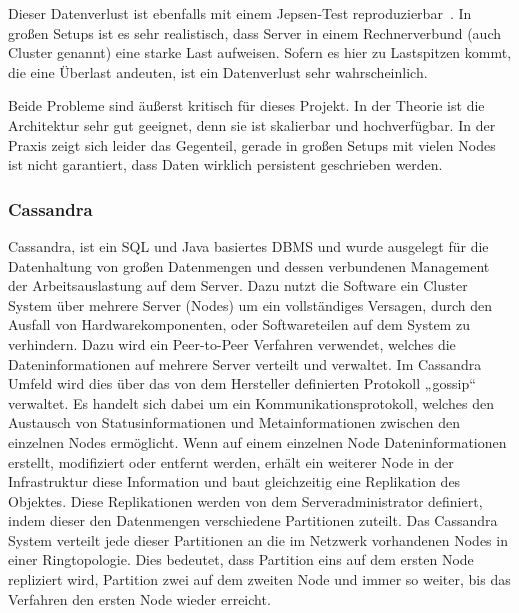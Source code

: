 Dieser Datenverlust ist ebenfalls mit einem Jepsen-Test
reproduzierbar~\cite{es_jepsen_pause}. In großen Setups ist es sehr
realistisch, dass Server in einem Rechnerverbund (auch Cluster genannt) eine
starke Last aufweisen. Sofern es hier zu Lastspitzen kommt, die eine Überlast
andeuten, ist ein Datenverlust sehr wahrscheinlich.

Beide Probleme sind äußerst kritisch für dieses Projekt. In der Theorie ist die
Architektur sehr gut geeignet, denn sie ist skalierbar und hochverfügbar. In
der Praxis zeigt sich leider das Gegenteil, gerade in großen Setups mit vielen
Nodes ist nicht garantiert, dass Daten wirklich persistent geschrieben werden.
\tm%

\subsubsection{Cassandra}
\label{subsubsec:cassandra}
Cassandra, ist ein \gls{SQL} und Java basiertes \gls{DBMS} und wurde ausgelegt
für die Datenhaltung von großen Datenmengen und dessen verbundenen
Management der Arbeitsauslastung auf dem Server. Dazu nutzt die Software ein
Cluster System über mehrere Server (Nodes) um ein vollständiges Versagen, durch
den Ausfall von Hardwarekomponenten, oder Softwareteilen auf dem System zu
verhindern. Dazu wird ein \gls{Peer-to-Peer} Verfahren verwendet, welches die
Dateninformationen auf mehrere Server verteilt und verwaltet. Im Cassandra
Umfeld wird dies über das von dem Hersteller definierten Protokoll „gossip“
verwaltet. Es handelt sich dabei um ein Kommunikationsprotokoll, welches den
Austausch von Statusinformationen und Metainformationen zwischen den einzelnen
Nodes ermöglicht. Wenn auf einem einzelnen Node Dateninformationen erstellt,
modifiziert oder entfernt werden, erhält ein weiterer Node in der Infrastruktur
diese Information und baut gleichzeitig eine Replikation des Objektes. Diese
Replikationen werden von dem Serveradministrator definiert, indem dieser den
Datenmengen verschiedene \gls{Partitionen} zuteilt. Das Cassandra System
verteilt jede dieser \gls{Partitionen} an die im Netzwerk vorhandenen Nodes
in einer \gls{Ringtopologie}. Dies bedeutet, dass Partition eins auf dem ersten
Node repliziert wird, Partition zwei auf dem zweiten Node und immer so weiter,
bis das Verfahren den ersten Node wieder erreicht.



